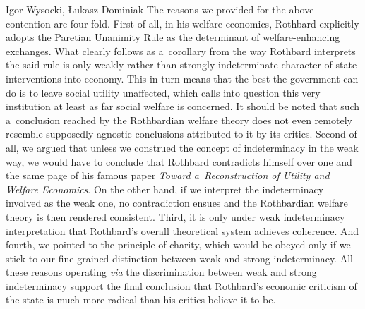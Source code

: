 \begin{artengenv}{Igor Wysocki, Łukasz Dominiak}
The reasons we provided for the above contention are four-fold. First of all, in his welfare economics, Rothbard explicitly adopts the Paretian Unanimity Rule as the determinant of welfare-enhancing exchanges. What clearly follows as a~corollary from the way Rothbard interprets the said rule is only weakly rather than strongly indeterminate character of state interventions into economy. This in turn means that the best the government can do is to leave social utility unaffected, which calls into question this very institution at least as far social welfare is concerned. It should be noted that such a~conclusion reached by the Rothbardian welfare theory does not even remotely resemble supposedly agnostic conclusions attributed to it by its critics. Second of all, we argued that unless we construed the concept of indeterminacy in the weak way, we would have to conclude that Rothbard contradicts himself over one and the same page of his famous paper \textit{Toward a~Reconstruction of Utility and Welfare Economics}. On the other hand, if we interpret the indeterminacy involved as the weak one, no contradiction ensues and the Rothbardian welfare theory is then rendered consistent. Third, it is only under weak indeterminacy interpretation that Rothbard's overall theoretical system achieves coherence. And fourth, we pointed to the principle of charity, which would be obeyed only if we stick to our fine-grained distinction between weak and strong indeterminacy. All these reasons operating \textit{via} the discrimination between weak and strong indeterminacy support the final conclusion that Rothbard's economic criticism of the state is much more radical than his critics believe it to be.





\end{artengenv}

